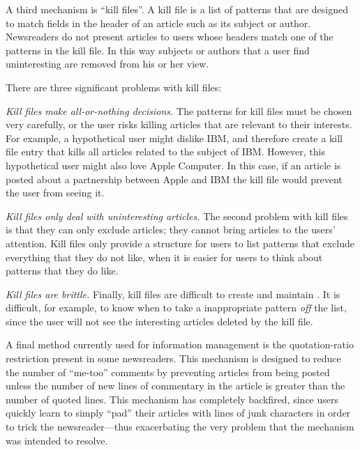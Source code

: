 A third mechanism is ``kill files''. A kill file is a list of patterns that
are designed to match fields in the header of an article such as its
subject or author. Newsreaders do not present articles to users
whose headers match one of the patterns in the kill file.  In this way
subjects or authors that a user find uninteresting are removed from his or
her view. 

There are three significant problems with kill files:
\begin {itemizenoindent}
\item {\em Kill files make all-or-nothing decisions.} The patterns for kill
  files must be chosen very carefully, or the user risks killing articles
  that are relevant to their interests. For example, a hypothetical user
  might dislike IBM, and therefore create a kill file entry that kills all
  articles related to the subject of IBM.  However, this hypothetical user
  might also love Apple Computer. In this case, if an article is posted about
  a partnership between Apple and IBM the kill file would prevent the user
  from seeing it.
  
\item {\em Kill files only deal with uninteresting articles.} The second
  problem with kill files is that they can only exclude articles; they cannot
  bring articles to the users' attention. Kill files only provide a structure
  for users to list patterns that exclude everything that they do not like,
  when it is easier for users to think about patterns that they do like.
  
\item {\em Kill files are brittle.} Finally, kill files are
  difficult to create and maintain \cite{cacm-infoscope-92}.  It is difficult,
  for example, to know when to take a inappropriate pattern {\em off} the list,
  since the user will not see the interesting articles deleted by the kill
  file.

\end {itemizenoindent}

A final method currently used for information management is the quotation-ratio
restriction present in some newsreaders.  This mechanism is designed to
reduce the number of ``me-too'' comments by preventing articles from being
posted unless the number of new lines of commentary in the article is
greater than the number of quoted lines.  This mechanism has completely
backfired, since users quickly learn to simply ``pad'' their articles with
lines of junk characters in order to trick the newsreader---thus
exacerbating the very problem that the mechanism was intended to resolve.







